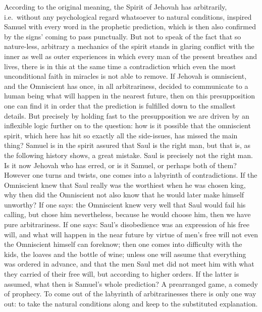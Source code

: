 \documentclass[12pt,a4paper,openany]{book}
\newcommand{\opage}[1]{\marginnote{\footnotesize\textit{[#1]}}}
\begin{document}
According to the original meaning, the Spirit of Jehovah
has arbitrarily, i.e.\ without any psychological regard whatsoever
to natural conditions, inspired Samuel with every word in
the prophetic prediction, which is then also confirmed
by the signs' coming to pass punctually. But not
to speak of the fact that so nature-less, arbitrary a mechanics of the spirit
stands in glaring conflict with the inner as well as
outer experiences in which every man of the present breathes
and lives, there is in this at the same time a contradiction which even
the most unconditional faith in miracles is not able to
remove. If Jehovah is omniscient, and the Omniscient
has once, in all arbitrariness, decided to communicate to
a human being what will happen in the nearest future,
then on this presupposition one can find it
in order that the prediction is fulfilled down to the smallest
details. But precisely by holding fast to
the presupposition we are driven by an inflexible logic
\setcounter{footnote}{0}%
\opage{12}further on to the question: how is it possible
that the omniscient spirit, which here has hit so exactly
all the side-issues, has missed the main thing? Samuel is in
the spirit assured that Saul is the right man, but
that is, as the following history shows, a great
mistake. Saul is precisely not the right man. Is
it now Jehovah who has erred, or is it Samuel,
or perhaps both of them? However one turns
and twists, one comes into a labyrinth of contradictions.
If the Omniscient knew that Saul really was
the worthiest when he was chosen king, why then did
the Omniscient not also know that he would later make
himself unworthy? If one says: the Omniscient knew very
well that Saul would fail his calling, but chose him
nevertheless, because he would choose him, then we have
pure arbitrariness. If one says: Saul's disobedience was
an expression of his free will, and what will happen in the near
future by virtue of men's free will
not even the Omniscient himself can foreknow; then one comes
into difficulty with the kids, the loaves and
the bottle of wine; unless one will assume that everything was
ordered in advance, and that the men Saul met did not meet
him with what they carried of their free will, but according to higher
orders. If the latter is assumed, what then is Samuel's
whole prediction? A prearranged game, a comedy
of prophecy. To come out of the labyrinth of arbitrarinesses
there is only one way out: to take the natural conditions
along and keep to the substituted
explanation.
\end{document}
